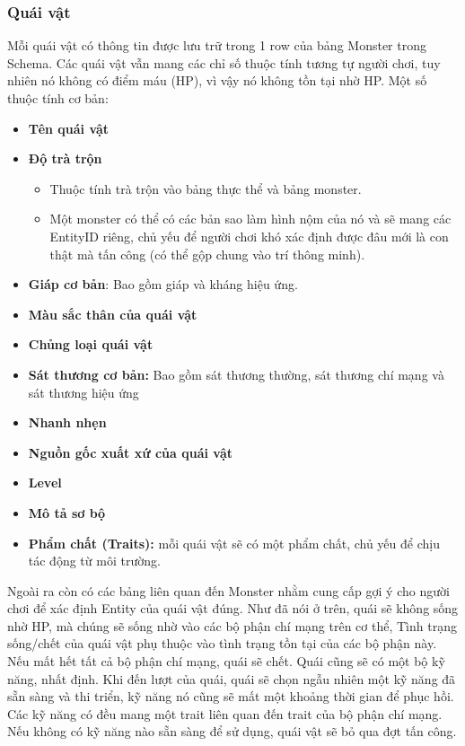 \subsubsection{Quái vật}
\hspace*{1cm} Mỗi quái vật có thông tin được lưu trữ trong 1 row của bảng Monster trong Schema. Các quái vật vẫn mang các chỉ số thuộc tính tương tự người chơi, tuy nhiên nó không có điểm máu (HP), vì vậy nó không tồn tại nhờ HP. Một số thuộc tính cơ bản:\\
\begin{itemize}
	\item \textbf{Tên quái vật}
	\item \textbf{Độ trà trộn}
	\begin{itemize}
		\item Thuộc tính trà trộn vào bảng thực thể và bảng monster.
		\item Một monster có thể có các bản sao làm hình nộm của nó và sẽ mang các EntityID riêng, chủ yếu để người chơi khó xác định được đâu mới là con thật mà tấn công (có thể gộp chung vào trí thông minh).
	\end{itemize}
	\item \textbf{Giáp cơ bản}: Bao gồm giáp và kháng hiệu ứng.
	\item \textbf{Màu sắc thân của quái vật}
	\item \textbf{Chủng loại quái vật}
	\item \textbf{Sát thương cơ bản: } Bao gồm sát thương thường, sát thương chí mạng và sát thương hiệu ứng
	\item \textbf{Nhanh nhẹn}
	\item \textbf{Nguồn gốc xuất xứ của quái vật}
	\item \textbf{Level}
	\item \textbf{Mô tả sơ bộ}
	\item \textbf{Phẩm chất (Traits):} mỗi quái vật sẽ có một phẩm chất, chủ yếu để chịu tác động từ môi trường.
\end{itemize}
\hspace*{1cm} Ngoài ra còn có các bảng liên quan đến Monster nhằm cung cấp gợi ý cho người chơi để xác định Entity của quái vật đúng.
\hspace*{1cm} Như đã nói ở trên, quái sẽ không sống nhờ HP, mà chúng sẽ sống nhờ vào các bộ phận chí mạng trên cơ thể, Tình trạng sống/chết của quái vật phụ thuộc vào tình trạng tồn tại của các bộ phận này. Nếu mất hết tất cả bộ phận chí mạng, quái sẽ chết. Quái cũng sẽ có một bộ kỹ năng, nhất định. Khi đến lượt của quái, quái sẽ chọn ngẫu nhiên một kỹ năng đã sẵn sàng và thi triển, kỹ năng nó cũng sẽ mất một khoảng thời gian để phục hồi. Các kỹ năng có đều mang một trait liên quan đến trait của bộ phận chí mạng. Nếu không có kỹ năng nào sẵn sàng để sử dụng, quái vật sẽ bỏ qua đợt tấn công.\\

